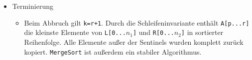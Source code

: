 \begin{itemize}
\begin{itemize}
\begin{itemize}
                    \end{itemize}
                \item Terminierung 
                    \begin{itemize}
                        \item[]
                            Beim Abbruch gilt \texttt{k=r+1}. Durch die Schleifeninvariante enthält \texttt{A[p...r]} die kleinste Elemente von 
                            \texttt{L[0...$n_1$]} und \texttt{R[0...$n_2$]} in sortierter Reihenfolge. Alle Elemente außer der Sentinels wurden
                            komplett zurück kopiert. \texttt{MergeSort} ist außerdem ein stabiler Algorithmus.
                    \end{itemize}
            \end{itemize}


\end{itemize}
